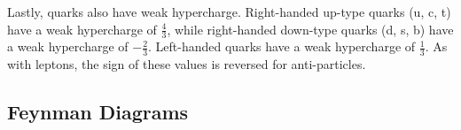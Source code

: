 Lastly, quarks also have weak hypercharge. Right-handed up-type quarks (u, c, t) have a weak hypercharge of $\frac{4}{3}$, while right-handed down-type quarks (d, s, b) have a weak hypercharge of $-\frac{2}{3}$. Left-handed quarks have a weak hypercharge of $\frac{1}{3}$. As with leptons, the sign of these values is reversed for anti-particles.

\subsection{Feynman Diagrams}


